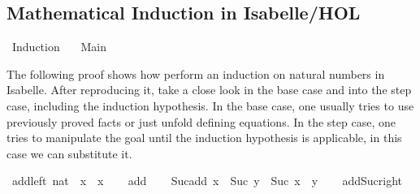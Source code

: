 %
\begin{isabellebody}%
%
%
\begin{isamarkuptext}%
\section*{Mathematical Induction in Isabelle/HOL}%
\end{isamarkuptext}\isamarkuptrue%
%
\isadelimtheory
%
\endisadelimtheory
%
\isatagtheory
{}\isamarkupfalse%
\ Induction\isanewline
\ \ \ Main\isanewline
{}%
\endisatagtheory
{\isafoldtheory}%
%
\isadelimtheory
%
\endisadelimtheory
%
\begin{isamarkuptext}%
The following proof shows how perform an induction on natural numbers in Isabelle. After
      reproducing it, take a close look in the base case and into the step case, including the
      induction hypothesis.
      In the base case, one usually tries to use previously proved facts or just unfold defining
      equations.
      In the step case, one tries to manipulate the goal until the induction hypothesis is applicable,
      in this case we can substitute it.%
\end{isamarkuptext}\isamarkuptrue%
\isamarkupfalse%
\ add{\isacharunderscore}{\kern0pt}{}{\isacharunderscore}{\kern0pt}left{\isacharcolon}{\kern0pt}\ {\isachardoublequoteopen}{\isacharparenleft}{\kern0pt}{}{\isacharcolon}{\kern0pt}{\isacharcolon}{\kern0pt}nat{\isacharparenright}{\kern0pt}\ {\isacharplus}{\kern0pt}\ x\ {\isacharequal}{\kern0pt}\ x{\isachardoublequoteclose}\isanewline
%
\isadelimproof
\ \ %
\endisadelimproof
%
\isatagproof
{}\isamarkupfalse%
\ add{\isacharunderscore}{\kern0pt}{}\isanewline
\ \ \isacommand{{\isachardot}{\kern0pt}}\isamarkupfalse%
%
\endisatagproof
{\isafoldproof}%
%
\isadelimproof
\isanewline
%
\endisadelimproof
\isanewline
{}\isamarkupfalse%
\ Suc{\isacharunderscore}{\kern0pt}add{\isacharunderscore}{\kern0pt}{}{\isacharcolon}{\kern0pt}\ {\isachardoublequoteopen}x\ {\isacharplus}{\kern0pt}\ Suc\ y\ {\isacharequal}{\kern0pt}\ Suc\ {\isacharparenleft}{\kern0pt}x\ {\isacharplus}{\kern0pt}\ y{\isacharparenright}{\kern0pt}{\isachardoublequoteclose}\isanewline
%
\isadelimproof
\ \ %
\endisadelimproof
%
\isatagproof
{}\isamarkupfalse%
\ add{\isacharunderscore}{\kern0pt}Suc{\isacharunderscore}{\kern0pt}right\isanewline
\ \ \isacommand{{\isachardot}{\kern0pt}}\isamarkupfalse%

\end{isabellebody}
